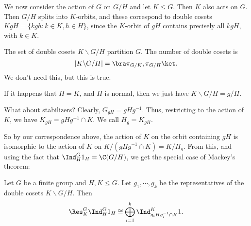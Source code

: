 \documentclass[a4paper]{article}
\begin{document}
We now consider the action of $G$ on $G/H$ and let $K \leq G$. Then $K$ also acts on $G$. Then $G/H$ splits into $K$-orbits, and these correspond to double cosets $KgH = \{kgh: k \in K, h \in H\}$, since the $K$-orbit of $gH$ contains precisely all $kgH$, with $k \in K$.

The set of double cosets $K \backslash G/H$ partition $G$. The number of double cosets is
\[
  |K \backslash G/H| = \bra \pi_{G/K}, \pi_{G/H}\ket.
\]
We don't need this, but this is true.

If it happens that $H = K$, and $H$ is normal, then we just have $K\backslash G/H = g/H$.

What about stabilizers? Clearly, $G_{gH} = gHg^{-1}$. Thus, restricting to the action of $K$, we have $K_{gH} = gHg^{-1} \cap K$. We call $H_g =K_{gH}$.

So by our correspondence above, the action of $K$ on the orbit containing $gH$ is isomorphic to the action of $K$ on $K/(gHg^{-1} \cap K) = K/H_g$. From this, and using the fact that $\Ind_H^G 1_H = \C(G/H)$, we get the special case of Mackey's theorem:
\begin{prop}
  Let $G$ be a finite group and $H, K \leq G$. Let $g_1, \cdots, g_k$ be the representatives of the double cosets $K \backslash G/H$. Then
  \[
    \Res_K^G \Ind_H^G 1_H \cong \bigoplus_{i = 1}^k \Ind_{g_iHg_i^{-1} \cap K}^K 1.
  \]
\end{prop}
\end{document}
